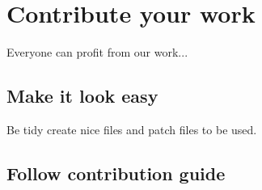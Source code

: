 \chapter{Contribute your work}\label{contrib}

Everyone can profit from our work...

\section{Make it look easy}

Be tidy create nice files and patch files to be used.

\section{Follow contribution guide}


